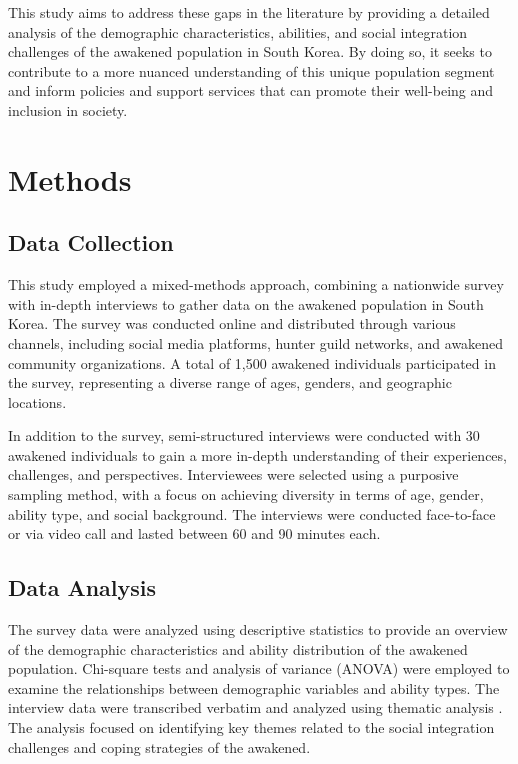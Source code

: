 \documentclass[12pt, a4paper]{article}
\begin{document}
This study aims to address these gaps in the literature by providing a detailed analysis of the demographic characteristics, abilities, and social integration challenges of the awakened population in South Korea. By doing so, it seeks to contribute to a more nuanced understanding of this unique population segment and inform policies and support services that can promote their well-being and inclusion in society.

\section{Methods}
\subsection{Data Collection}
This study employed a mixed-methods approach, combining a nationwide survey with in-depth interviews to gather data on the awakened population in South Korea. The survey was conducted online and distributed through various channels, including social media platforms, hunter guild networks, and awakened community organizations. A total of 1,500 awakened individuals participated in the survey, representing a diverse range of ages, genders, and geographic locations.

In addition to the survey, semi-structured interviews were conducted with 30 awakened individuals to gain a more in-depth understanding of their experiences, challenges, and perspectives. Interviewees were selected using a purposive sampling method, with a focus on achieving diversity in terms of age, gender, ability type, and social background. The interviews were conducted face-to-face or via video call and lasted between 60 and 90 minutes each.

\subsection{Data Analysis}
The survey data were analyzed using descriptive statistics to provide an overview of the demographic characteristics and ability distribution of the awakened population. Chi-square tests and analysis of variance (ANOVA) were employed to examine the relationships between demographic variables and ability types. The interview data were transcribed verbatim and analyzed using thematic analysis \citep{braun2006using}. The analysis focused on identifying key themes related to the social integration challenges and coping strategies of the awakened.
\end{document}
